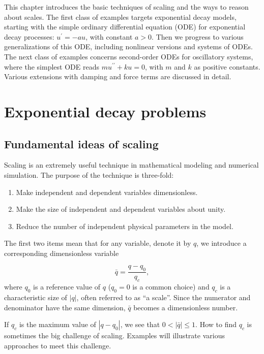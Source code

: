\documentclass[graybox,envcountchap,sectrefs,final]{svmonodo}
\begin{document}
This chapter introduces the basic techniques of scaling and the ways to
reason about scales. The first class of examples targets exponential
decay models, starting with the simple ordinary differential equation (ODE)
for exponential decay processes: $u^{\prime}=-au$, with constant $a>0$.
Then we progress to various generalizations of this ODE, including nonlinear
versions and systems of ODEs. The next class of examples concerns
second-order ODEs for oscillatory systems, where the simplest
ODE reads $mu^{\prime\prime} + ku=0$, with $m$ and $k$ as positive constants.
Various extensions with damping and force terms are discussed in detail.


\section{Exponential decay problems}
\label{sec:scale:decay}

\subsection{Fundamental ideas of scaling}



Scaling is an extremely useful technique in mathematical modeling and
numerical simulation.  The purpose of the technique is three-fold:

\begin{enumerate}
\item Make independent and dependent variables dimensionless.

\item Make the size of independent and dependent variables about unity.

\item Reduce the number of independent physical parameters in the model.
\end{enumerate}

\noindent
{}

The first two items mean that for any variable, denote it by
$q$, we introduce a corresponding dimensionless variable

\[ \bar q = \frac{q-q_0}{q_c},\]
where $q_0$ is a reference value of $q$ ($q_0=0$ is a common choice) and
$q_c$ is a characteristic size of $|q|$, often referred to as ``a scale''.
Since the numerator and denominator
have the same dimension, $\bar q$ becomes a dimensionless number.

If $q_c$ is the maximum value of $|q-q_0|$, we see that $0 < |\bar
q|\leq 1$. How to find $q_c$ is sometimes the big challenge of
scaling. Examples will illustrate various approaches to meet this
challenge.
\end{document}
